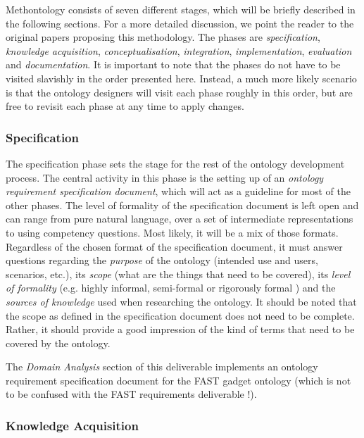 \documentclass[twoside]{fast_latex}
\begin{document}
Methontology consists of seven different stages, which will be briefly described in the following sections. For a more detailed discussion, we point the reader to the original papers proposing this methodology. The phases are \emph{specification}, \emph{knowledge acquisition}, \emph{conceptualisation}, \emph{integration}, \emph{implementation}, \emph{evaluation} and \emph{documentation}. It is important to note that the phases do not have to be visited slavishly in the order presented here. Instead, a much more likely scenario is that the ontology designers will visit each phase roughly in this order, but are free to revisit each phase at any time to apply changes.

\subsubsection{Specification} %
\label{ssub:specification}

The specification phase sets the stage for the rest of the ontology development process. The central activity in this phase is the setting up of an \emph{ontology requirement specification document}, which will act as a guideline for most of the other phases. The level of formality of the specification document is left open and can range from pure natural language, over a set of intermediate representations to using competency questions. Most likely, it will be a mix of those formats. Regardless of the chosen format of the specification document, it must answer questions regarding the \emph{purpose} of the ontology (intended use and users, scenarios, etc.), its \emph{scope} (what are the things that need to be covered), its \emph{level of formality} (e.g. highly informal, semi-formal or rigorously formal \cite{uschold1996ontologies}) and the \emph{sources of knowledge} used when researching the ontology. It should be noted that the scope as defined in the specification document does not need to be complete. Rather, it should provide a good impression of the kind of terms that need to be covered by the ontology.

The \emph{Domain Analysis} section of this deliverable implements an ontology requirement specification document for the FAST gadget ontology (which is not to be confused with the FAST requirements deliverable \cite{villoslada2010fast_requirements}!).

\subsubsection{Knowledge Acquisition} %
\label{ssub:knowledge_acquisition}
\end{document}
